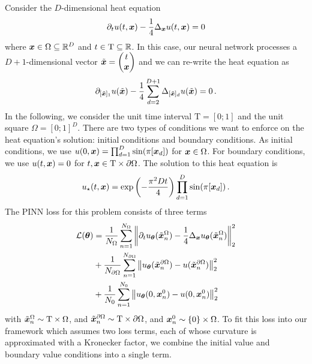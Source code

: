 Consider the $D$-dimensional heat equation
\begin{align*}
  \partial_{t} u(t, {\bm{x}})
  -
  \frac{1}{4} \Delta_{{\bm{x}}} u(t, {\bm{x}})
  =
  0
\end{align*}
where ${\bm{x}} \in \Omega \subseteq {\mathbb{R}}^D$ and $t \in \mathrm{T} \subseteq {\mathbb{R}}$.
In this case, our neural network processes a $D+1$-dimensional vector $\tilde{{\bm{x}}} =
\begin{pmatrix} t \\ {\bm{x}} \end{pmatrix}$ and we can re-write the heat equation as
\begin{align*}
  \partial_{[\tilde{{\bm{x}}}]_1} u(\tilde{{\bm{x}}})
  -
  \frac{1}{4} \sum_{d=2}^{D+1} \Delta_{[\tilde{{\bm{x}}}]_d} u(\tilde{{\bm{x}}})
  =
  0\,.
\end{align*}
In the following, we consider the unit time interval $\mathrm{T} = [0;1]$ and the unit square $\Omega = [0;1]^D$.
There are two types of conditions we want to enforce on the heat equation's solution: initial conditions and boundary conditions.
As initial conditions, we use $u(0, {\bm{x}}) = \prod_{d=1}^D \sin(\pi [{\bm{x}}_d])$ for ${\bm{x}} \in \Omega$.
For boundary conditions, we use $u(t, {\bm{x}}) = 0$ for $t, {\bm{x}} \in \mathrm{T} \times \partial\Omega$.
The solution to this heat equation is
\begin{align*}
  u_{\star}(t, {\bm{x}})
  =
  \exp \left(-\frac{\pi^2 D t}{4} \right)
  \prod_{d=1}^D \sin(\pi [{\bm{x}}_d])\,.
\end{align*}
The PINN loss for this problem consists of three terms
\begin{align*}
  {\mathcal{L}}({\bm{\theta}})
  &=
    \frac{1}{N_{\Omega}}
    \sum_{n=1}^{N_{\Omega}}
    \left\lVert
    \partial_t u_{{\bm{\theta}}}(\tilde{{\bm{x}}}_n^{\Omega})
    -
    \frac{1}{4} \Delta_{{\bm{x}}} u_{{\bm{\theta}}}(\tilde{{\bm{x}}}_n^{\Omega})
    \right\rVert^2_2
  \\
  &+
    \frac{1}{N_{\partial\Omega}}
    \sum_{n=1}^{N_{\partial\Omega}}
    \left\lVert
    u_{{\bm{\theta}}}(\tilde{{\bm{x}}}_n^{\partial\Omega})
    -
    u(\tilde{{\bm{x}}}_n^{\partial\Omega})
    \right\rVert^2_2
  \\
  &+
    \frac{1}{N_0}
    \sum_{n=1}^{N_0}
    \left\lVert
    u_{{\bm{\theta}}}(0, {\bm{x}}_n^0)
    -
    u(0, {\bm{x}}_n^0)
    \right\rVert^2_2
\end{align*}
with $\tilde{{\bm{x}}}_n^{\Omega} \sim \mathrm{T} \times \Omega$, and $\tilde{{\bm{x}}}_n^{\partial\Omega} \sim \mathrm{T} \times \partial\Omega$, and ${\bm{x}}_n^0 \sim \{0\} \times \Omega$.
To fit this loss into our framework which assumes two loss terms, each of whose curvature is approximated with a Kronecker factor, we combine the initial value and boundary value conditions into a single term.
